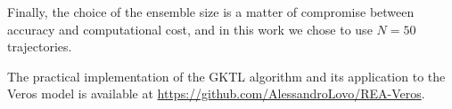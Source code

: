 Finally, the choice of the ensemble size is a matter of compromise between accuracy and computational cost, and in this work we chose to use $N = 50$ trajectories.

The practical implementation of the GKTL algorithm and its application to the Veros model is available at \url{https://github.com/AlessandroLovo/REA-Veros}.
